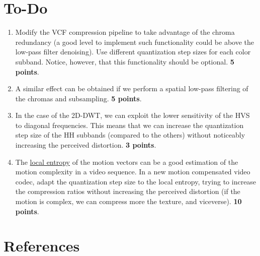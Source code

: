 \section{To-Do}
\begin{enumerate}
\item Modify the VCF compression pipeline to take advantage of the
  chroma redundancy (a good level to implement such functionality
  could be above the low-pass filter denoising). Use different
  quantization step sizes for each color subband. Notice, however,
  that this functionality should be optional. \textbf{5 points}.
\item A similar effect can be obtained if we perform a spatial
  low-pass filtering of the chromas and subsampling. \textbf{5
    points}.
\item In the case of the 2D-DWT, we can exploit the lower sensitivity
  of the HVS to diagonal frequencies. This means that we can increase
  the quantization step size of the HH subbands (compared to the
  others) without noticeably increasing the perceived
  distortion. \textbf{3 points}.
\item The
  \href{https://scikit-image.org/docs/stable/auto_examples/filters/plot_entropy.html}{local
    entropy} of the motion vectors can be a good estimation of the
  motion complexity in a video sequence. In a new motion compensated
  video codec, adapt the quantization step size to the local entropy,
  trying to increase the compression ratios without increasing the
  perceived distortion (if the motion is complex, we can compress more
  the texture, and viceverse). \textbf{10 points}.
\end{enumerate}

\section{References}

\renewcommand{\addcontentsline}[3]{}%

